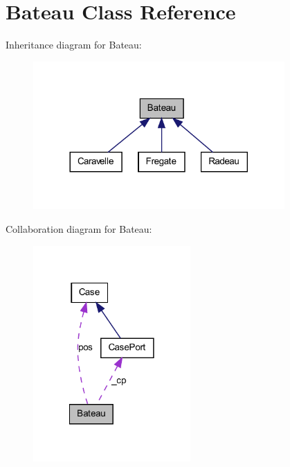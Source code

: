 \hypertarget{class_bateau}{
\section{Bateau Class Reference}
\label{class_bateau}
}


Inheritance diagram for Bateau:
\nopagebreak
\begin{figure}[H]
\begin{center}
\leavevmode
\includegraphics[width=272pt]{class_bateau__inherit__graph}
\end{center}
\end{figure}


Collaboration diagram for Bateau:
\nopagebreak
\begin{figure}[H]
\begin{center}
\leavevmode
\includegraphics[width=170pt]{class_bateau__coll__graph}
\end{center}
\end{figure}
